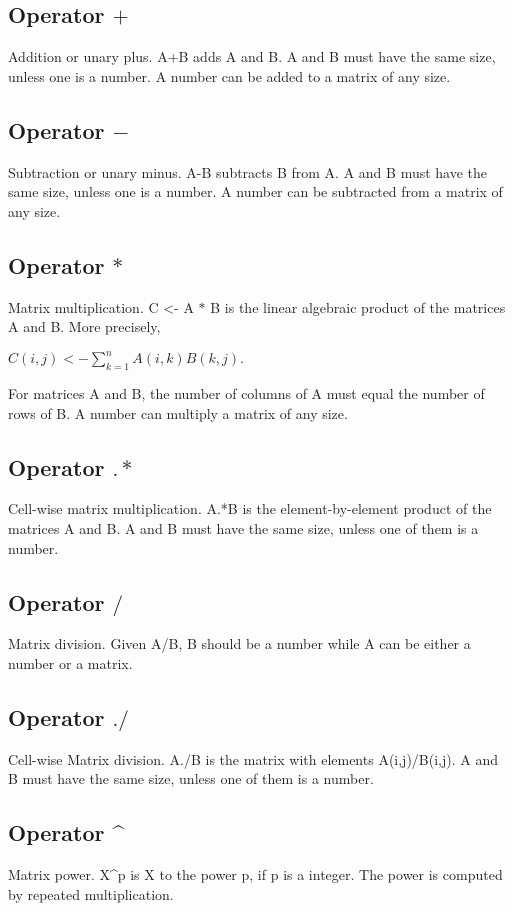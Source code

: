 \documentclass[prodmode,acmtecs]{acmsmall}
\begin{document}
\subsection{Operator $+$}
Addition or unary plus. A+B adds A and B. A and B must have the same size,
unless one is a number. A number can be added to a matrix of any size.
\medskip

\subsection{Operator $-$}
Subtraction or unary minus. A-B subtracts B from A. A and B must have the
same size, unless one is a number. A number can be subtracted from a matrix
of any size.
\medskip

\subsection{Operator $*$}
Matrix multiplication. C <- A $*$ B is the linear algebraic product of the
matrices A and B. More precisely,

$C(i,j) <- \displaystyle\sum\limits_{k=1}^n A(i,k)B(k,j).$

For matrices A and B, the number of columns of A must equal the number of
rows of B. A number can multiply a matrix of any size.
\medskip

\subsection{Operator $.*$}
Cell-wise matrix multiplication. A.*B is the element-by-element product
of the matrices A and B. A and B must have the same size, unless one of
them is a number.
\medskip

\subsection{Operator $/$}
Matrix division. Given A/B, B should be a number while A can be either a
number or a matrix.
\medskip

\subsection{Operator $./$}
Cell-wise Matrix division. A./B is the matrix with elements A(i,j)/B(i,j).
A and B must have the same size, unless one of them is a number.
\medskip

\subsection{Operator \^{}}
Matrix power. X\^{}p is X to the power p, if p is a integer. The power
is computed by repeated multiplication.
\medskip
\end{document}
